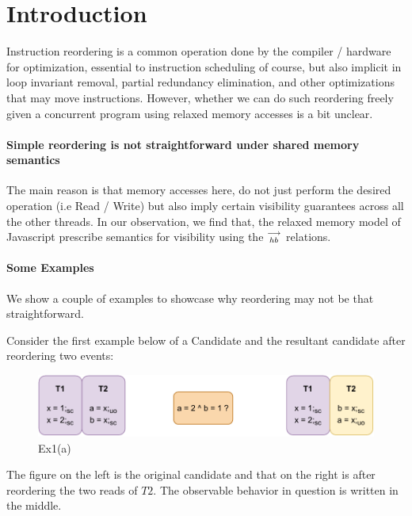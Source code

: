 
\section{Introduction}
    Instruction reordering is a common operation done by the compiler / hardware for optimization, essential to instruction scheduling of course, but also implicit in loop invariant removal, partial redundancy elimination, and other optimizations that may move instructions. 
    However, whether we can do such reordering freely given a concurrent program using relaxed memory accesses is a bit unclear. 
     
    \paragraph{Simple reordering is not straightforward under shared memory semantics}
    The main reason is that memory accesses here, do not just perform the desired operation (i.e Read / Write) but also imply certain visibility guarantees across all the other threads.  
    In our observation, we find that, the relaxed memory model of Javascript prescribe semantics for visibility using the $\stackrel{\longrightarrow}{_{hb}}$ relations. 
    
    \paragraph{Some Examples}

        We show a couple of examples to showcase why reordering may not be that straightforward. 

        Consider the first example below of a Candidate and the resultant candidate after reordering two events:
        
        \begin{figure}[H]
            \centering
            \includegraphics[scale=0.7]{5.InstructionReordering/0.Intro/ReorderingExample1(a).pdf}
            \caption{Ex1(a)} 
        \end{figure}

        The figure on the left is the original candidate and that on the right is after reordering the two reads of $T2$.
        The observable behavior in question is written in the middle. 

